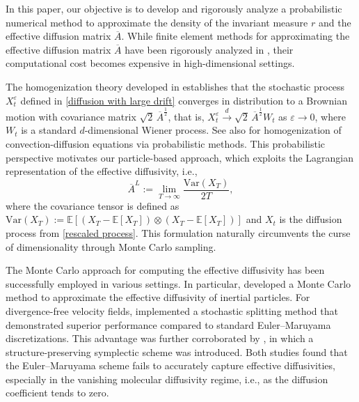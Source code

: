 \documentclass[12pt,a4paper,reqno]{amsart}
\numberwithin{equation}{section}
\begin{document}
In this paper, our objective is to develop and rigorously analyze a probabilistic numerical method to approximate the density of the invariant measure $r$ and the effective diffusion matrix $\overline{A}$. While finite element methods for approximating the effective diffusion matrix $\overline{A}$ have been rigorously analyzed in \cite{Spr24,SSZ25}, their computational cost becomes
expensive in high-dimensional settings. 

The homogenization theory developed in \cite{BLP11,PS08} establishes  that the stochastic process $X^\varepsilon_t$ defined in \eqref{diffusion with large drift}
converges in distribution to a Brownian motion with covariance matrix $\sqrt{2}\,\overline{A}^{\frac{1}{2}}$, that is, $X^\varepsilon_t \overset{d}{\to}\sqrt{2}\,\overline{A}^{\frac{1}{2}}W_t$ as $\varepsilon \to 0$, where $W_t$ is a standard $d$-dimensional Wiener process.  See also \cite{FP94,Gar97,HP08,LOY98,PS08} for homogenization of convection-diffusion equations via probabilistic methods. This probabilistic perspective motivates our particle-based approach, which exploits the Lagrangian representation of the effective diffusivity, i.e.,
\begin{equation*}
    \overline{A}^L := \lim\limits_{T \to \infty}\frac{\mathrm{Var}(X_T)}{2T},
\end{equation*}
where the covariance tensor is defined as $\mathrm{Var}(X_T) := \mathbb{E}\left[\left(X_T - \mathbb{E}[X_T]\right)\otimes\left(X_T - \mathbb{E}[X_T]\right)\right]$ and $X_t$ is the 
diffusion process from \eqref{rescaled process}. This formulation naturally circumvents the curse of dimensionality through Monte Carlo sampling. 

  
The Monte Carlo approach for computing the effective diffusivity has been successfully employed in various settings. In particular, \cite{PSB06} developed a Monte Carlo method to approximate the effective diffusivity of inertial particles. For divergence-free velocity fields, \cite{PSZ09} implemented a stochastic splitting method that demonstrated superior performance compared to standard Euler--Maruyama discretizations. This advantage was further corroborated by \cite{WXZ18}, in which a structure-preserving symplectic scheme was introduced. Both studies found that the Euler--Maruyama scheme fails to accurately capture effective diffusivities, especially in the vanishing molecular diffusivity regime, i.e., as the diffusion coefficient tends to zero.
\end{document}
